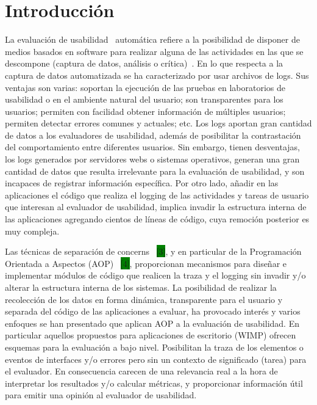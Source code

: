 \section{Introducción}
\label{sec:intro}

La evaluación de usabilidad~\cite{ISO1998} automática refiere a la posibilidad de disponer de medios basados en software para realizar alguna de las actividades en las que se descompone (captura de datos, análisis o crítica)~\cite{IH2001}. En lo que respecta a la captura de datos automatizada se ha caracterizado por usar archivos de logs. Sus ventajas son varias: soportan la ejecución de las pruebas en laboratorios de usabilidad o en el ambiente natural del usuario; son transparentes para los usuarios; permiten con facilidad obtener información de múltiples usuarios; permiten detectar errores comunes y actuales; etc. Los logs aportan gran cantidad de datos a los evaluadores de usabilidad, además de posibilitar la contrastación del comportamiento entre diferentes usuarios. Sin embargo, tienen desventajas, los logs generados por servidores webs o sistemas operativos, generan una gran cantidad de datos que resulta irrelevante para la evaluación de usabilidad, y son incapaces de registrar información específica. Por otro lado, añadir en las aplicaciones el código que realiza el logging de las actividades y  tareas de usuario que interesan al evaluador de usabilidad, implica invadir la estructura interna de las aplicaciones agregando cientos de líneas de código, cuya remoción posterior es muy compleja.

Las técnicas de separación de concerns~\cite{KLM+1997} \colorbox{green}{[3]}, y en particular de la Programación Orientada a Aspectos (AOP)~\cite{NIELSEN1992} \colorbox{green}{[4]}, proporcionan mecanismos para diseñar e implementar módulos de código que realicen la traza y el logging sin invadir y/o alterar la estructura interna de los sistemas. La posibilidad de realizar la recolección de los datos en forma dinámica, transparente para el usuario y separada del código de las aplicaciones a evaluar, ha provocado interés y varios enfoques se han presentado que aplican AOP a la evaluación de usabilidad. En particular aquellos propuestos para aplicaciones de escritorio (WIMP) ofrecen esquemas para la evaluación a bajo nivel. Posibilitan la traza de los elementos o eventos de interfaces y/o errores pero sin un contexto de significado (tarea) para el evaluador. En consecuencia carecen de una relevancia real a la hora de interpretar los resultados y/o calcular métricas, y proporcionar información útil para emitir una opinión al evaluador de usabilidad. 


